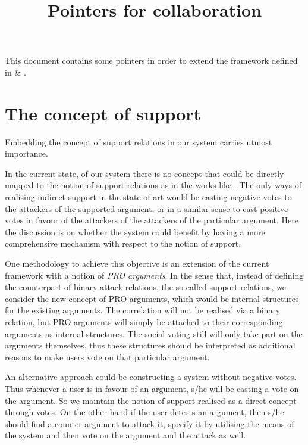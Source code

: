 \documentclass{article}
\begin{document}
\title{Pointers for collaboration}

\maketitle

This document contains some pointers in order to extend the framework defined in \cite{leite2011social} \& \cite{eml2013esaf}.
\\
\section{The concept of support} %

Embedding the concept of support relations in our system carries utmost importance.

In the current state, of our system there is no concept that could be directly mapped to the notion of support relations as in the works like \cite{DBLP:journals/ijis/AmgoudCLL08}. The only ways of realising indirect support in the state of art would be casting negative votes to the attackers of the supported argument, or in a similar sense to cast positive votes in favour of the attackers of the attackers of the particular argument. Here the discussion is on whether the system could benefit by having a more comprehensive mechanism with respect to the notion of support. 

One methodology to achieve this objective is an extension of the current framework with a notion of \emph{PRO arguments}. In the sense that, instead of defining the counterpart of binary attack relations, the so-called support relations, we consider the new concept of PRO arguments, which would be internal structures for the existing arguments. The correlation will not be realised via a binary relation, but PRO arguments will simply be attached to their corresponding arguments as internal structures. The social voting still will only take part on the arguments themselves, thus these structures should be interpreted as additional reasons to make users vote on that particular argument.

An alternative approach could be constructing a system without negative votes. Thus whenever a user is in favour of an argument, s/he will be casting a vote on the argument. So we maintain the notion of support realised as  a direct concept through votes. On the other hand if the user detests an argument, then s/he should find a counter argument to attack it, specify it by utilising the means of the system and then vote on the argument and the attack as well.
\end{document}
